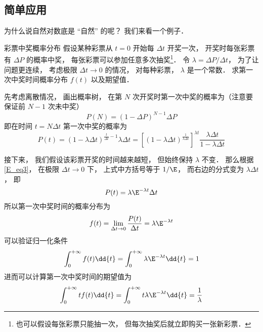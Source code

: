 \subsection{简单应用}
为什么说自然对数底是 “自然” 的呢？ 我们来看一个例子．

\begin{example}{彩票中奖概率分布}
假设某种彩票从 $t = 0$ 开始每 $\Delta t$ 开奖一次， 开奖时每张彩票有 $\Delta P$ 的概率中奖， 每张彩票可以参加任意多次抽奖\footnote{也可以假设每张彩票只能抽一次， 但每次抽奖后就立即购买一张新彩票．}． 令 $\lambda = {\Delta P}/{\Delta t}$， 为了让问题更连续， 考虑极限 $\Delta t\to 0$ 的情况， 对每种彩票， $\lambda$ 是一个常数． 求第一次中奖时间概率分布 $f(t)$ 以及期望值．

先考虑离散情况， 画出概率树， 在第 $N$ 次开奖时第一次中奖的概率为（注意要保证前 $N-1$ 次未中奖）
\begin{equation}
P(N) = (1-\Delta P)^{N-1} \Delta P
\end{equation}
即在时间 $t = N\Delta t$ 第一次中奖的概率为
\begin{equation}
P(t) = (1-\lambda\Delta t)^{\frac{t}{\Delta t}-1} \lambda\Delta t
= [(1-\lambda\Delta t)^{\frac{1}{\lambda\Delta t}}]^{\lambda t} \frac{\lambda\Delta t}{1-\lambda\Delta t}
\end{equation}

接下来， 我们假设该彩票开奖的时间越来越短， 但始终保持 $\lambda$ 不变． 那么根据\autoref{E_eq3}， 在极限 $\Delta t\to 0$ 下， 上式中方括号等于 $1/\E$， 而右边的分式变为 $\lambda \Delta t$， 即
\begin{equation}
P(t) = \lambda\E^{-\lambda t}\Delta t
\end{equation}
所以第一次中奖时间的概率分布为
\begin{equation}
f(t) = \lim_{\Delta t\to 0} \frac{P(t)}{\Delta t} = \lambda\E^{-\lambda t}
\end{equation}
可以验证归一化条件
\begin{equation}
\int_0^{+\infty} f(t) \dd{t} = \int_0^{+\infty} \lambda\E^{-\lambda t} \dd{t} = 1
\end{equation}
进而可以计算第一次中奖时间的期望值为
\begin{equation}
\int_0^{+\infty} t f(t) \dd{t} = \int_0^{+\infty}t \lambda\E^{-\lambda t} \dd{t} = \frac{1}{\lambda}
\end{equation}
\end{example}
